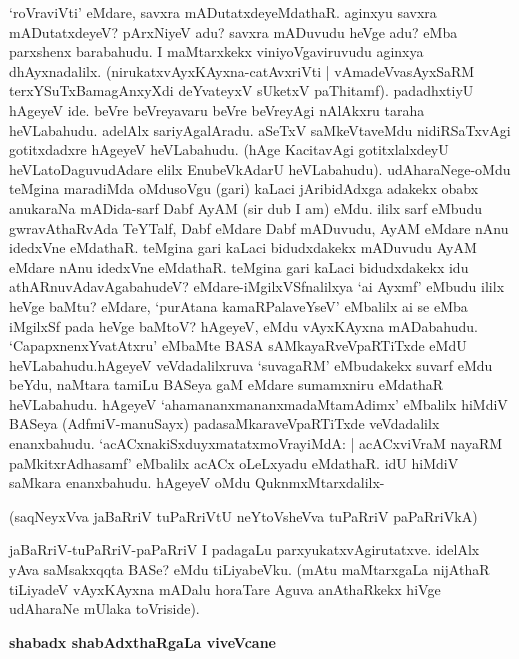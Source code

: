 \noindent
`roVraviVti' eMdare, savxra mADutatxdeyeMdathaR. aginxyu savxra 
mADutatxdeyeV? pArxNiyeV adu? savxra mADuvudu heVge adu? eMba 
parxshenx barabahudu. I maMtarxkekx viniyoVgaviru\-vudu aginxya 
dhAyxnadalilx. (nirukatxvAyxKAyxna-catAvxriVti | vAmadeVvasAyxSaRM\label{112} 
terxYSuTxBamagAnxyXdi deYvateyxV sUketxV paThi\-tamf). padadhxtiyU hAgeyeV ide. beVre beVreyavaru beVre beVreyAgi nAlAkxru taraha heVLa\-bahudu. adelAlx sariyAgalAradu. aSeTxV saMkeVtaveMdu nidiRSaTxvAgi gotitxdadxre hAgeyeV heVLa\-bahudu. (hAge KacitavAgi gotitxlalxdeyU heVLatoDaguvudAdare elilx Enu\break beVkAdarU heVLa\-ba\-hudu). udA\-hara\-Nege-oMdu teMgina maradiMda oMdu\break soVgu (gari) kaLaci jAribidAdxga adakekx obabx\- anukaraNa mADida\--sarf Dabf AyAM {(\rm sir dub I am)} eMdu. ililx sarf eMbudu gwravAthaRvAda TeYTalf, Dabf eMdare Dabf mADuvudu, AyAM eMdare nAnu idedxVne eMdathaR. teMgina gari kaLaci bidudxdakekx mADuvudu AyAM eMdare\- nAnu idedxVne eMdathaR. teMgina gari kaLaci bidudxdakekx idu athARnuvAda\-vAgabahudeV? eMdare\--iMgilxVSfnalilxya `ai Ayxmf' \hbox{eMbudu} ililx heVge baMtu? eMdare, `purAtana kamaRPalaveYseV' eMbalilx\- ai se eMba iMgilxSf pada heVge baMtoV? hAgeyeV, eMdu vAyxKAyxna mADa\-bahudu. `Capapx\-nenxYva\-tAtxru' eMbaMte BASA sAMkayaRveVpaRTiTxde eMdU heVLabahudu.\break hAgeyeV veVdadalilxruva `suvagaRM'\- eMbudakekx suvarf eMdu beYdu, naMtara tamiLu BASeya gaM eMdare sumamxniru eMdathaR heVLa\-bahudu. hAgeyeV `aha\-mananxmananxmadaMtamAdimx' eMbalilx hiMdiV BASeya (AdfmiV-manuSayx) pada\-saMkaraveVpaRTiTxde veVdadalilx enanxbahudu. `acACxnakiSxduyxmatatxmoVrayiMdA: | acACxviVraM nayaRM\- paMkitxrAdhasamf' eMbalilx acACx oLeLxyadu eMdathaR. idU hiMdiV saMkara enanxbahudu. hAgeyeV oMdu QuknmxMtarxdalilx-

(saqNeyxVva jaBaRriV tuPaRriVtU neYtoVsheVva tuPaRriV paPaRriVkA)\label{113}

jaBaRriV-tuPaRriV-paPaRriV I padagaLu parxyukatxvAgirutatxve. idelAlx yAva saMsakxqqta BASe? eMdu tiLiyabeVku. (mAtu maMtarxgaLa nijAthaR tiLiyadeV vAyxKAyxna mADalu horaTare Aguva anAthaRkekx hiVge udAharaNe mUlaka toVriside).

{\bigskip
\noindent
{\large\bf shabadx shabAdxthaRgaLa viveVcane}}\label{page113}
\medskip

